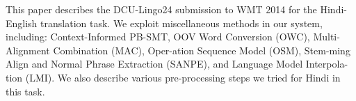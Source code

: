 This paper describes the DCU-Lingo24 submission to WMT 2014 for the Hindi- English translation task. We exploit miscellaneous methods in our system, including: Context-Informed PB-SMT, OOV Word Conversion (OWC), Multi-Alignment Combination (MAC), Oper-ation Sequence Model (OSM), Stem-ming Align and Normal Phrase Extraction (SANPE), and Language Model Interpola-tion (LMI). We also describe various pre-processing steps we tried for Hindi in this task.
